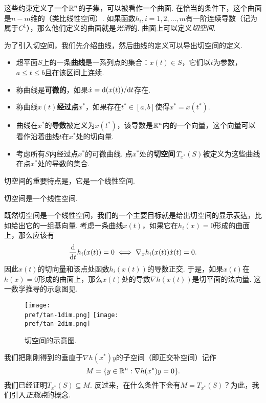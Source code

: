 这些约束定义了一个$\mathbb{R}^n$的子集，可以被看作一个曲面. 在恰当的条件下，这个曲面是$n-m$维的（类比线性空间）. 如果函数$h_i,i=1,2,\dots,m$有一阶连续导数（记为属于$C^1$），那么他们定义的曲面就是\emph{光滑}的. 曲面上可以定义\emph{切空间}.
    
为了引入切空间，我们先介绍曲线，然后曲线的定义可以导出切空间的定义. 
\begin{definition}[曲线与切空间]
\begin{itemize}
    \item 超平面$S$上的一条\textbf{曲线}是一系列点的集合：${x}(t)\in S$，它们以$t$为参数，$a\le t\le b$且在该区间上连续. 
    \item 称曲线是\textbf{可微的}，如果$\dot{{x}}=\mathrm{d}({x}(t))/\mathrm{d} t$存在. 
    \item 称曲线${x}(t)$\textbf{经过点${x^\ast}$}，如果存在$t^\ast\in[a,b]$使得${x^\ast}={x}(t^\ast)$. 
    \item 曲线在${x^\ast}$的\textbf{导数}被定义为$\dot{{x}}(t^\ast)$，该导数是$\mathbb{R}^n$内的一个向量，这个向量可以看作沿着曲线$t$在$x^\ast$处的切向量.
    \item 考虑所有$S$内经过点${x^\ast}$的可微曲线. 点${x^\ast}$处的\textbf{切空间}\,$T_{x^\ast}(S)$被定义为这些曲线在点${x^\ast}$处的导数的集合. 
\end{itemize}
\end{definition}

切空间的重要特点是，它是一个线性空间.
\begin{lemma}\label{lemma:tan-space}
    切空间是一个线性空间. 
\end{lemma}

既然切空间是一个线性空间，我们的一个主要目标就是给出切空间的显示表达，比如给出它的一组基向量. 考虑一条曲线$x(t)$，如果它在$h_i(x)=0$形成的曲面上，那么应该有
    \[\frac{\mathrm{d}}{\mathrm{d} t}h_i(x(t))=0\iff \nabla_x h_i(x(t))\dot{x}(t)=0.\]
因此${x}(t)$的切向量和该点处函数$h_i({x}(t))$的导数正交. 于是，如果$x(t)$在$h(x)=0$形成的曲面上，那么${x}(t)$处的导数$\nabla h(x(t))$是切平面的法向量. 这一数学推导的示意图见.

\begin{figure}
\centering
    \texttt{[image: \\pref/tan-1dim.png]}
\centering
    \texttt{[image: \\pref/tan-2dim.png]}
\caption{切空间的示意图.}
\label{fig:tangent-space}
\end{figure}
    
我们把刚刚得到的垂直于$\nabla {h(x^\ast)y}$的子空间（即正交补空间）记作
    \[M=\{{y}\in\mathbb{R}^n:\nabla {h(x^\ast)y}=0\}.\]
我们已经证明$T_{x^\ast}(S)\subseteq M$. 反过来，在什么条件下会有$M=T_{x^\ast}(S)$？为此，我们引入\emph{正规点}的概念. 

